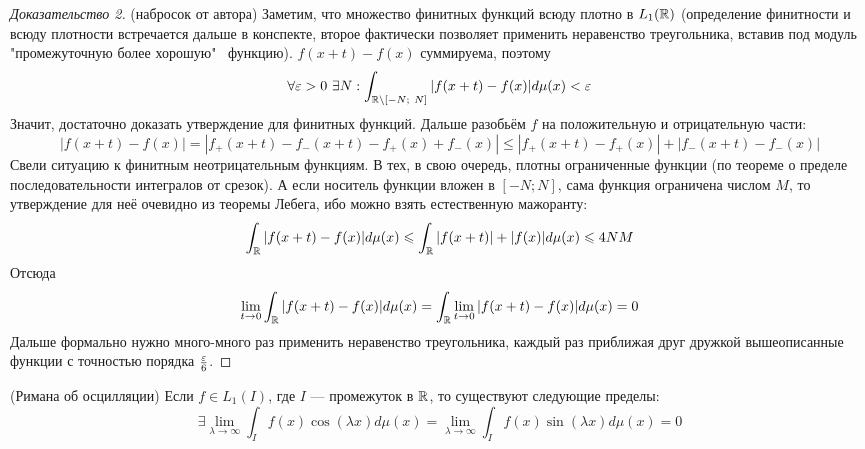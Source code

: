 \begin{proof}[Доказательство 2] (набросок от автора)
	Заметим, что множество финитных функций всюду плотно в $L_1(\mathbb{R})$ (определение финитности и всюду плотности встречается дальше в конспекте, второе фактически позволяет применить неравенство треугольника, вставив под модуль "промежуточную более хорошую" \ функцию). $f(x+t) - f(x)$ суммируема, поэтому
	\[
		\forall \eps > 0 \ \exists N : \int_{\R \setminus [-N; \ N]} |f(x + t) - f(x)| d\mu(x) < \eps
	\]
	Значит, достаточно доказать утверждение для финитных функций. Дальше разобьём $f$ на положительную и отрицательную части:
	\[
		|f(x + t) - f(x)| = |f_+(x + t) - f_-(x + t) - f_+(x) 	+ f_-(x)| \leq |f_+(x + t) - f_+(x)| + |f_-(x + t) - f_-(x)|
	\]
	Свели ситуацию к финитным неотрицательным функциям. В тех, в свою очередь, плотны ограниченные функции (по теореме о пределе последовательности интегралов от срезок). А если носитель функции вложен в $[-N; N]$, сама функция ограничена числом $M$, то утверждение для неё очевидно из теоремы  Лебега, ибо можно взять естественную мажоранту:
	\[
		\int_{\mathbb{R}} |f(x + t) - f(x)| d\mu(x) \leqslant \int_{\mathbb{R}} |f(x + t)| + |f(x)| d\mu(x) \leqslant 4NM
	\]
	Отсюда
	\[
		\lim_{t \to 0} \int_{\mathbb{R}} |f(x + t) - f(x)|d\mu(x) = \int_{\mathbb{R}} \lim_{t \to 0} |f(x + t) - f(x)|d\mu(x) = 0
	\]
	Дальше формально нужно много-много раз применить неравенство треугольника, каждый раз приближая друг дружкой вышеописанные функции с точностью порядка $\frac{\varepsilon}{6}$.
\end{proof}

\begin{theorem} (Римана об осцилляции)
	Если $f \in L_1(I)$, где $I$ --- промежуток в $\mathbb{R}$, то существуют следующие пределы:
	\[
		\exists \lim_{\lambda \to \infty} \int_I f(x)\cos(\lambda x)d\mu(x) = \lim_{\lambda \to \infty} \int_I f(x)\sin(\lambda x)d\mu(x) = 0
	\]
\end{theorem}

